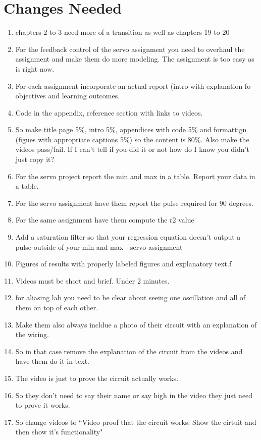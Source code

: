 \section{Changes Needed}
\begin{enumerate}[itemsep=-5pt]
\item chapters 2 to 3 need more of a transition as well as chapters 19 to 20
\item For the feedback control of the servo assignment you need to overhaul the assignment and make them do more modeling. The assignment is too easy as is right now. 
\item For each assignment incorporate an actual report (intro with explanation fo objectives and learning outcomes.
\item Code in the appendix, reference section with links to videos.
\item So make title page 5\%, intro 5\%, appendices with code 5\% and formattign (figues with appropriate captions 5\%) so the content is 80\%. Also make the videos pass/fail. If I can't tell if you did it or not how do I know you didn't just copy it?
\item For the servo project report the min and max in a table. Report your data in a table.
\item For the servo assignment have them report the pulse required for 90 degrees.
\item For the same assignment have them compute the r2 value
\item Add a saturation filter so that your regression equation doesn't output a pulse outside of your min and max - servo assignment
\item Figures of results with properly labeled figures and explanatory text.f
\item Videos must be short and brief. Under 2 minutes. 
\item for aliasing lab you need to be clear about seeing one oscillation and all of them on top of each other. 
\item Make them also always incldue a photo of their circuit with an explanation of the wiring.
\item So in that case remove the explanation of the circuit from the videos and have them do it in text.
\item The video is just to prove the circuit actually works.
\item So they don't need to say their name or say high in the video they just need to prove it works.
\item So change videos to ``Video proof that the circuit works. Show the cirtuit and then show it's functionality"

\end{enumerate}
